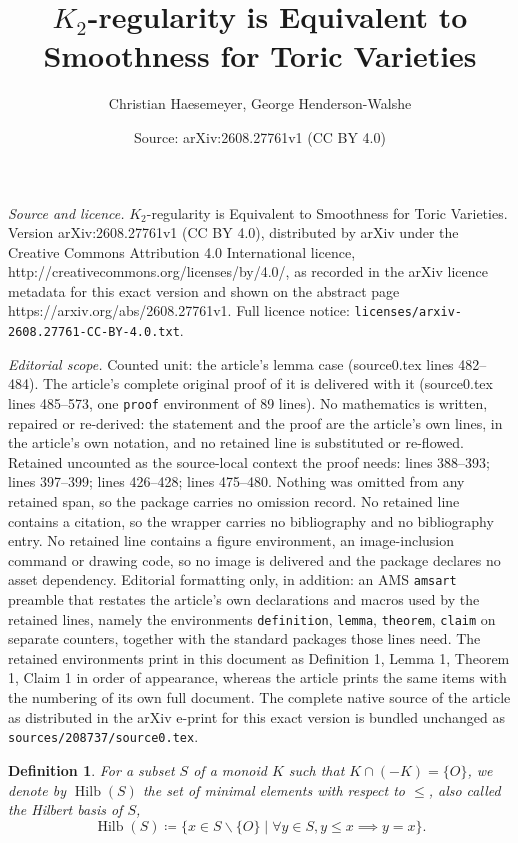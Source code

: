 \documentclass[10pt,a4paper]{amsart}
\title{$K_2$-regularity is Equivalent to Smoothness for Toric Varieties}
\author{Christian Haesemeyer, George Henderson-Walshe}
\date{Source: arXiv:2608.27761v1 (CC BY 4.0)}
\newtheorem{definition}{Definition}
\DeclareMathOperator{\Hilb}{Hilb}
\begin{document}
\maketitle

\noindent\emph{Source and licence.} $K_2$-regularity is Equivalent to Smoothness for Toric Varieties. Version arXiv:2608.27761v1 (CC BY 4.0), distributed by arXiv under the Creative Commons Attribution 4.0 International licence, http://creativecommons.org/licenses/by/4.0/, as recorded in the arXiv licence metadata for this exact version and shown on the abstract page https://arxiv.org/abs/2608.27761v1. Full licence notice: \texttt{licenses/arxiv-2608.27761-CC-BY-4.0.txt}.\par\smallskip

\noindent\textit{Editorial scope.} Counted unit: the article's lemma case (source0.tex lines 482--484). The article's complete original proof of it is delivered with it (source0.tex lines 485--573, one \texttt{proof} environment of 89 lines). No mathematics is written, repaired or re-derived: the statement and the proof are the article's own lines, in the article's own notation, and no retained line is substituted or re-flowed.  Retained uncounted as the source-local context the proof needs: lines 388--393; lines 397--399; lines 426--428; lines 475--480.  Nothing was omitted from any retained span, so the package carries no omission record.  No retained line contains a citation, so the wrapper carries no bibliography and no bibliography entry.  No retained line contains a figure environment, an image-inclusion command or drawing code, so no image is delivered and the package declares no asset dependency.  Editorial formatting only, in addition: an AMS \texttt{amsart} preamble that restates the article's own declarations and macros used by the retained lines, namely the environments \texttt{definition}, \texttt{lemma}, \texttt{theorem}, \texttt{claim} on separate counters, together with the standard packages those lines need.  The retained environments print in this document as Definition 1, Lemma 1, Theorem 1, Claim 1 in order of appearance, whereas the article prints the same items with the numbering of its own full document.  The complete native source of the article as distributed in the arXiv e-print for this exact version is bundled unchanged as \texttt{sources/208737/source0.tex}.
\begin{definition} \label{definition: hilbert basis}
For a subset $S$ of a monoid $K$ such that $K \cap (-K) = \{ O \}$, we denote by $\Hilb(S)$ the set of minimal elements with respect to $\leq$, also called the \emph{Hilbert basis} of $S$,
\begin{equation}
\Hilb(S) \coloneq \{x \in S \backslash \{ O \} \mid \forall y \in S, y \leq x \implies y = x \}.
\end{equation}
\end{definition}
\end{document}
